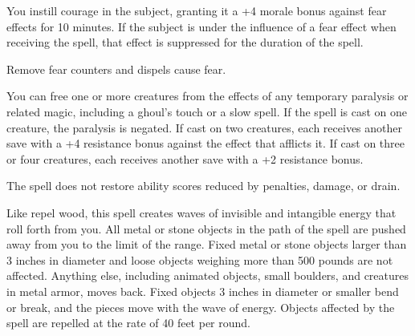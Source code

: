 \begin{multicols}{2}
\begin{small}

\noindent You instill courage in the subject, granting it a +4 morale bonus against fear effects for 10 minutes. If the subject is under the influence of a fear effect when receiving the spell, that effect is suppressed for the duration of the spell.

\smallskip\noindent Remove fear counters and dispels cause fear.

\noindent You can free one or more creatures from the effects of any temporary paralysis or related magic, including a ghoul's touch or a slow spell. If the spell is cast on one creature, the paralysis is negated. If cast on two creatures, each receives another save with a +4 resistance bonus against the effect that afflicts it. If cast on three or four creatures, each receives another save with a +2 resistance bonus.

\smallskip\noindent The spell does not restore ability scores reduced by penalties, damage, or drain.

\noindent Like repel wood, this spell creates waves of invisible and intangible energy that roll forth from you. All metal or stone objects in the path of the spell are pushed away from you to the limit of the range. Fixed metal or stone objects larger than 3 inches in diameter and loose objects weighing more than 500 pounds are not affected. Anything else, including animated objects, small boulders, and creatures in metal armor, moves back. Fixed objects 3 inches in diameter or smaller bend or break, and the pieces move with the wave of energy. Objects affected by the spell are repelled at the rate of 40 feet per round.


\end{small}
\end{multicols}
